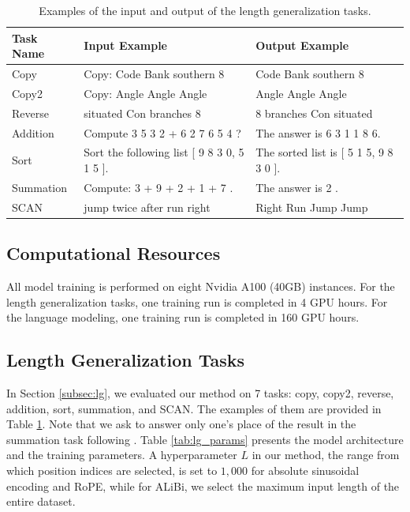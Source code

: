\documentclass[11pt]{article}
\begin{document}
\begin{table}
  \centering
  \begin{tabular}{lll}
    \toprule
    \textbf{Task Name} & \textbf{Input Example} & \textbf{Output Example} \\
    \midrule
    Copy & Copy: Code Bank southern 8 & Code Bank southern 8 \\
    Copy2 & Copy: Angle Angle Angle & Angle Angle Angle \\
    Reverse & situated Con branches 8 & 8 branches Con situated \\
    Addition & Compute 3 5 3 2 + 6 2 7 6 5 4 ? & The answer is 6 3 1 1 8 6. \\
    Sort & Sort the following list [ 9 8 3 0, 5 1 5 ].  & The sorted list is [ 5 1 5, 9 8 3 0 ]. \\
    Summation & Compute: 3 + 9 + 2 + 1 + 7 . & The answer is 2 . \\
    SCAN & jump twice after run right & Right Run Jump Jump \\
    \bottomrule
  \end{tabular}
  \caption{Examples of the input and output of the length generalization tasks.}
  \label{tab:lg_tasks}
\end{table}

\subsection{Computational Resources}
All model training is performed on eight Nvidia A100 (40GB) instances. For the length generalization tasks, one training run is completed in 4 GPU hours. For the language modeling, one training run is completed in 160 GPU hours.

\subsection{Length Generalization Tasks}\label{subsec:lgt}

In Section \ref{subsec:lg}, we evaluated our method on 7 tasks: copy, copy2, reverse, addition, sort, summation, and SCAN. The examples of them are provided in Table \ref{tab:lg_tasks}. Note that we ask to answer only one's place of the result in the summation task following \citet{kazemnejad2023impact}. Table \ref{tab:lg_params} presents the model architecture and the training parameters. A hyperparameter $L$ in our method, the range from which position indices are selected, is set to $1,000$ for absolute sinusoidal encoding and RoPE, while for ALiBi, we select the maximum input length of the entire dataset.
\end{document}

